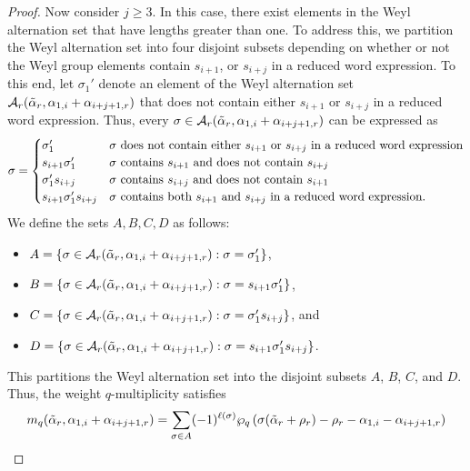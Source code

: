 \documentclass[10pt]{article}
\newcommand{\hr}[0]{\Tilde{\alpha}}
\newcommand{\qpartition}[1]{\wp_q\left(#1\right)}
\begin{document}
\begin{proof}
    Now consider $j\geq3$.
    In this case, there exist elements in the Weyl alternation set that have lengths greater than one. 
    To address this, we partition the Weyl alternation set into four disjoint subsets depending on whether or not the Weyl group elements contain $s_{i+1}$, or $s_{i+j}$ in a reduced word expression.
    To this end, let $\sigma_1'$ denote an element of the Weyl alternation set  $\mathcal{A}_r(\hr_r,\alpha_{1,i}+\alpha_{i+j+1,r})$ that does not contain either $s_{i+1}$ or $s_{i+j}$ in a reduced word expression.
    Thus, every $\sigma\in \mathcal{A}_r(\hr_r,\alpha_{1,i}+\alpha_{i+j+1,r})$ can be expressed as
    \begin{equation}
        \sigma = \begin{cases}
        \sigma_1' & \text{$\sigma$ does not contain either $s_{i+1}$ or $s_{i+j}$ in a reduced word expression} \\
        s_{i+1}\sigma_1' & \text{$\sigma$ contains $s_{i+1}$ and does not contain $s_{i+j}$} \\
        \sigma_1's_{i+j} & \text{$\sigma$ contains $s_{i+j}$ and does not contain $s_{i+1}$} \\
        s_{i+1}\sigma_1's_{i+j} & \text{$\sigma$ contains both $s_{i+1}$ and $s_{i+j}$ in a reduced word expression}.\notag
    \end{cases}
    \end{equation}
    We define the sets $A,B,C,D$ as follows:
    \begin{itemize}
        \item $A=\{\sigma\in\mathcal{A}_r(\hr_r,\alpha_{1,i}+\alpha_{i+j+1,r}): \sigma=\sigma_1'\}$, 
        \item $B=\{\sigma\in\mathcal{A}_r(\hr_r,\alpha_{1,i}+\alpha_{i+j+1,r}): \sigma=s_{i+1}\sigma_1'\}$,
        \item $C=\{\sigma\in\mathcal{A}_r(\hr_r,\alpha_{1,i}+\alpha_{i+j+1,r}): \sigma=\sigma_1's_{i+j}\}$, and 
        \item $D=\{\sigma\in\mathcal{A}_r(\hr_r,\alpha_{1,i}+\alpha_{i+j+1,r}): \sigma=s_{i+1}\sigma_1's_{i+j}\}$. 
    \end{itemize}
    This partitions the Weyl alternation set into the disjoint subsets $A$, $B$, $C$, and $D$. Thus, the weight $q$-multiplicity satisfies
    \begin{align}
    m_q(\hr_r,\alpha_{1,i}+\alpha_{i+j+1,r}) 
    &= \sum_{\sigma\in A} (-1)^{\ell(\sigma)}\qpartition{\sigma(\hr_r+\rho_r)-\rho_r-\alpha_{1,i}-\alpha_{i+j+1,r}} \notag \\

\end{align}
\end{proof}
\end{document}
